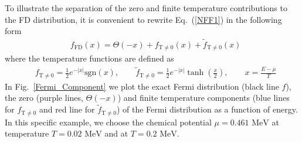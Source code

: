 \documentclass[sn-mathphys,Numbered]{sn-jnl}
\newcommand*{\MeV}{\text{ MeV}}
\newcommand*{\xmagenta}{\color{magenta}}
\begin{document}
To illustrate the separation of the zero and finite temperature contributions to the FD distribution, it is convenient to rewrite Eq.~(\ref{NFF1}) in the following form
\begin{align}\label{Eq_form}
&f_\mathrm{FD}(x)=\Theta(-x)+f_\mathrm{T\neq0}(x)+\widetilde f_\mathrm{T\neq0}(x)
\end{align}
where the temperature functions are defined as
\begin{align}
&f_\mathrm{T\neq0}=\frac{1}{2}e^{ -|x| }\mathrm{sgn}\left(x\right),\qquad
\widetilde f_\mathrm{T\neq0}=\frac{1}{2}e^{ - |x| }\tanh\left(\frac{x}{2}\right),\qquad x=\frac{E-\mu}{T}
\end{align}
In Fig.~\ref{Fermi_Component} we plot the exact Fermi distribution (black line $f$), the zero (purple lines, $\Theta(-x)$) and finite temperature components (blue lines for $f_\mathrm{T\neq0}$ and red line for $\widetilde f_\mathrm{T\neq0}$) of the Fermi distribution as a function of energy. In this specific example, we choose the chemical potential $\mu=0.461\MeV$ at temperature $T=0.02\MeV$ and at $T=0.2\MeV$.
\end{document}
